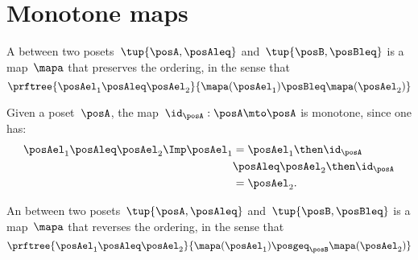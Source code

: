 

\section{Monotone maps}\label{sec:monotonicity-monotone-maps}


\begin{definition}
    \label{def:monotone}
    A \emph{} between two posets~$\tup{\posA, \posAleq}$ and~$\tup{\posB, \posBleq}$ is a map~$\mapa$ that preserves the ordering, in the sense that
    \begin{equation}
        \prftree{\posAel_1 \posAleq \posAel_2 }{\mapa(\posAel_1) \posBleq \mapa(\posAel_2)}
    \end{equation}
\end{definition}
\begin{remark}
    Given a poset~$\posA$, the map~$\id_\posA: \posA \mto \posA$ is monotone, since one has:
    \begin{equation*}
        \begin{aligned}
            \posAel_1\posAleq \posAel_2 \Imp \posAel_1&=\posAel_1\then \id_\posA\\
            &\posAleq \posAel_2\then \id_\posA \\
            &= \posAel_2.
        \end{aligned}
    \end{equation*}
\end{remark}

\begin{definition}
    \label{def:antitone}
    An \emph{} between two posets~$\tup{\posA, \posAleq}$ and~$\tup{\posB, \posBleq}$ is a map~$\mapa$ that reverses the ordering, in the sense that
    \begin{equation}
        \prftree{\posAel_1 \posAleq \posAel_2}{\mapa(\posAel_1) \posgeq_\posB \mapa(\posAel_2)}
    \end{equation}
\end{definition}


